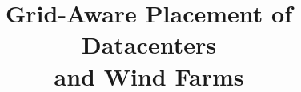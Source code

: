 \documentclass[conference]{IEEEtran}
\begin{document}
\title{Grid-Aware Placement of Datacenters\\and Wind Farms
}

%





\date{}

\maketitle








%



\end{document}
